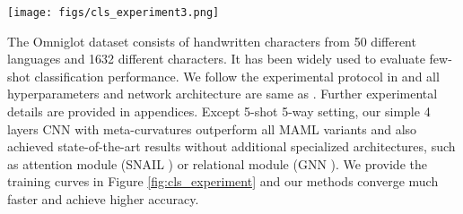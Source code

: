 \documentclass{article}
\begin{document}
\begin{figure*}[t]
\begin{center}
\centerline{\texttt{[image: figs/cls\_experiment3.png]}}
\caption{Few-shot classification accuracy over training iterations.}
\label{fig:cls_experiment}
\end{center}
\end{figure*}

The Omniglot dataset consists of handwritten characters from 50 different languages and 1632 different characters. It has been widely used to evaluate few-shot classification performance. We follow the experimental protocol in \cite{Finn-icml-2017} and all hyperparameters and network architecture are same as \cite{Finn-icml-2017}. Further experimental details are provided in appendices. Except 5-shot 5-way setting, our simple 4 layers CNN with meta-curvatures outperform all MAML variants and also achieved state-of-the-art results without additional specialized architectures, such as attention module (SNAIL \cite{snail}) or relational module (GNN \cite{gnn}). We provide the training curves in Figure \ref{fig:cls_experiment} and our methods converge much faster and achieve higher accuracy.
\end{document}
